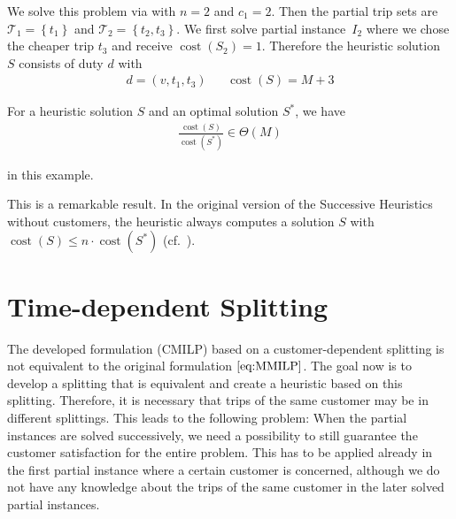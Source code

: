 \begin{example}
We solve this problem via  with $n=2$ and $c_1=2$. Then the partial trip sets are ${\mathcal{T}_1=\left\{t_1\right\}}$ and ${\mathcal{T}_2=\left\{t_2,t_3\right\}}$. We first solve partial instance~$I_2$ where we chose the cheaper trip $t_3$ and receive ${\operatorname{cost}\left(S_2\right)=1}$. Therefore the heuristic solution~$S$ consists of duty $d$ with
\begin{align*}
	d = \left(v, t_1, t_3\right) && \operatorname{cost}\left(S\right) = M+3
\end{align*}

For a heuristic solution $S$ and an optimal solution $S^*$, we have
\begin{align*}
	\frac{\operatorname{cost}\left(S\right)}{\operatorname{cost}\left(S^*\right)}\in\Theta(M)
\end{align*}

in this example.

\end{example}

This is a remarkable result. In the original version of the Successive Heuristics without customers, the heuristic always computes a solution $S$ with ${\operatorname{cost}\left(S\right)\leq n\cdot\operatorname{cost}\left(S^*\right)}$ (cf.~\cite[p.~130]{Knoll}).


\section{Time-dependent Splitting}
\label{sec:time_dependent_splitting}

The developed formulation (CMILP) based on a customer-dependent splitting is not equivalent to the original formulation $\eqref{eq:MMILP}$. The goal now is to develop a splitting that is equivalent and create a heuristic based on this splitting. Therefore, it is necessary that trips of the same customer may be in different splittings. This leads to the following problem: When the partial instances are solved successively, we need a possibility to still guarantee the customer satisfaction for the entire problem. This has to be applied already in the first partial instance where a certain customer is concerned, although we do not have any knowledge about the trips of the same customer in the later solved partial instances.

